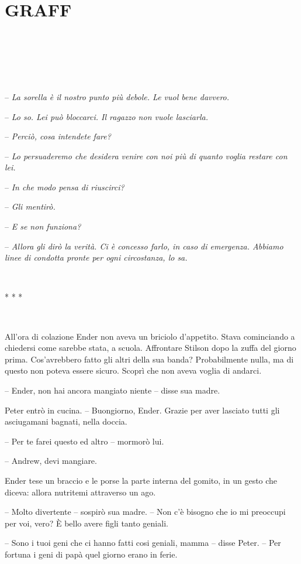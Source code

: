 \chapter{GRAFF}

{~}

{~}

{~}

{-- \emph{La sorella è il nostro punto più debole. Le vuol bene
		davvero.}}

{-- \emph{Lo so. Lei può bloccarci. Il ragazzo non vuole lasciarla.}}

{-- \emph{Perciò, cosa intendete fare?}}

{-- \emph{Lo persuaderemo che desidera venire con noi più di quanto
		voglia restare con lei.}}

{-- \emph{In che modo pensa di riuscirci?}}

{-- \emph{Gli mentirò.}}

{-- \emph{E se non funziona?}}

{-- \emph{Allora gli dirò la verità. Ci è concesso farlo, in caso di
		emergenza. Abbiamo linee di condotta pronte per ogni circostanza, lo
		sa.}}

{~}

\begin{center}
	{* * *}
\end{center}

{~}

{All'ora di colazione Ender non aveva un briciolo d'appetito. Stava
	cominciando a chiedersi come sarebbe stata, a scuola. Affrontare Stilson
	dopo la zuffa del giorno prima. Cos'avrebbero fatto gli altri della sua
	banda? Probabilmente nulla, ma di questo non poteva essere sicuro.
	Scoprì che non aveva voglia di andarci.}

{-- Ender, non hai ancora mangiato niente -- disse sua madre.}

{Peter entrò in cucina. -- Buongiorno, Ender. Grazie per aver lasciato
	tutti gli asciugamani bagnati, nella doccia.}

{-- Per te farei questo ed altro -- mormorò lui.}

{-- Andrew, devi mangiare.}

{Ender tese un braccio e le porse la parte interna del gomito, in un
	gesto che diceva: allora nutritemi attraverso un ago.}

{-- Molto divertente -- sospirò sua madre. -- Non c'è bisogno che io mi
	preoccupi per voi, vero? È bello avere figli tanto geniali.}

{-- Sono i tuoi geni che ci hanno fatti cosi geniali, mamma -- disse
	Peter. -- Per fortuna i geni di papà quel giorno erano in ferie.}

